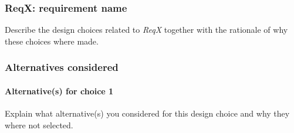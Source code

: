 \subsubsection{ReqX\@: requirement name}
Describe the design choices related to \emph{ReqX} together with the rationale
of why these choices where made.

\subsubsection*{Alternatives considered}
\paragraph{Alternative(s) for choice 1} Explain what alternative(s) you
considered for this design choice and why they where not selected.
